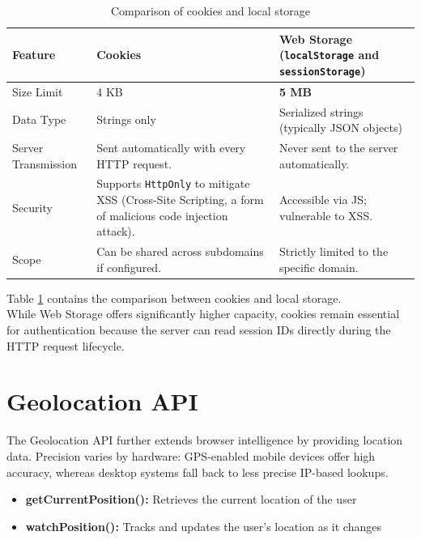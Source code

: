 \documentclass{scrbook}
\begin{document}
	\begin{table}[h]
	\centering
	\begin{tabular}{|l|p{5cm}|p{5cm}|}
	\hline
	\textbf{Feature} & \textbf{Cookies} & \textbf{Web Storage (\texttt{localStorage} and \texttt{sessionStorage})} \\
	\hline
	Size Limit          & 4 KB & \textbf{5 MB} \\
	\hline
	Data Type           & Strings only & Serialized strings (typically JSON objects) \\
	\hline
	Server Transmission & Sent automatically with every HTTP request. & Never sent to the server automatically. \\
	\hline
	Security            & Supports \texttt{HttpOnly} to mitigate XSS (Cross-Site Scripting, a form of malicious code injection attack). & Accessible via JS; vulnerable to XSS. \\
	\hline
	Scope               & Can be shared across subdomains if configured. & Strictly limited to the specific domain. \\
	\hline
	\end{tabular}
	\caption{Comparison of cookies and local storage}
	\label{tbl:cookies_local_storage_comparison}
	\end{table}
	
	Table \ref{tbl:cookies_local_storage_comparison} contains the comparison between cookies and local storage.\\
	
	While Web Storage offers significantly higher capacity, cookies remain essential for authentication because the server can read session IDs directly during the HTTP request lifecycle.
	
	\section{Geolocation API}
	
	The Geolocation API further extends browser intelligence by providing location data. Precision varies by hardware: GPS-enabled mobile devices offer high accuracy, whereas desktop systems fall back to less precise IP-based lookups.
	
	\begin{itemize}
		\item \textbf{getCurrentPosition():} Retrieves the current location of the user
		
		\item \textbf{watchPosition():} Tracks and updates the user’s location as it changes
	\end{itemize}
	
\end{document}

